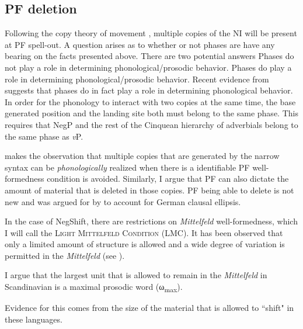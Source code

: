 \documentclass[12pt, letterpaper]{article}
\newcommand{\sub}[1]{\textsubscript{#1}}
\begin{document}
\subsection{PF deletion} \label{sec:NEXT}
\ea  Following the copy theory of movement \citet{chomskyMinimalistProgramLinguistic1993}, multiple copies of the NI will be present at PF spell-out. 
\ex A question arises as to whether or not phases are have any bearing on the facts presented above. 
\ex There are two potential answers
	\ea Phases do not play a role in determining phonological/prosodic behavior.  
	\ex Phases do play a role in determining phonological/prosodic behavior.
	\z 
\ex Recent evidence from \citet{weberPhasebasedConstraintsMatch2020} suggests that phases do in fact play a role in determining phonological behavior. 
\ex In order for the phonology to interact with two copies at the same time, the base generated position and the landing site both must belong to the same phase. 
	\ea This requires that NegP and the rest of the Cinquean hierarchy of adverbials \citep{cinqueAdverbsFunctionalHeads1999} belong to the same phase as \emph{v}P.
	\z

\ex \citet{kandybowiczGrammarRepetitionNupe2008} makes the observation that multiple copies that are generated by the narrow syntax can be \emph{phonologically} realized when there is a identifiable PF well-formedness condition is avoided. 
	\ea Similarly, I argue that PF can also dictate the amount of material that is deleted in those copies. 
	\ex PF being able to delete is not new and was argued for by \citet{ottDeletionClausalEllipsis2016} to account for German clausal ellipsis. 
	\z 

\ex In the case of NegShift, there are restrictions on \emph{Mittelfeld} well-formedness, which I will call the \textsc{Light Mittelfeld Condition} (LMC).
	\ea It has been observed that only a limited amount of structure is allowed and a wide degree of variation is permitted in the \emph{Mittelfeld} (see \cite{haiderMittelfeldPhenomenaScrambling2017}). 

	\ex I argue that the largest unit that is allowed to remain in the \emph{Mittelfeld} in Scandinavian is a maximal prosodic word (ω\sub{max}).
	\z 

\ex Evidence for this comes from the size of the material that is allowed to ``shift" in these languages. 
\end{document}

